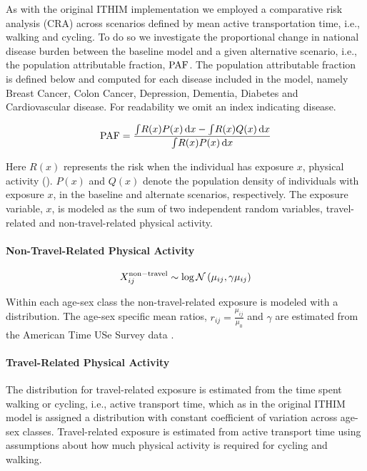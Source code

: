 As with the original ITHIM implementation we employed a comparative
risk analysis (CRA) across scenarios defined by mean active
transportation time, i.e., walking and cycling.  To do so we
investigate the proportional change in national disease burden between
the baseline model and a given alternative scenario, i.e., the
population attributable fraction, $\mathrm{PAF}$.  The population attributable
fraction is defined below and computed for each disease included in
the model, namely Breast Cancer, Colon Cancer, Depression, Dementia,
Diabetes and Cardiovascular disease.  For readability we omit an index
indicating disease.

\begin{equation}
\mathrm{PAF} = \frac{\int \! R(x)P(x) \, \mathrm{d}x  - \int \! R(x)Q(x) \,
  \mathrm{d}x}{\int \! R(x)P(x) \, \mathrm{d}x} \label{paf}
\end{equation}

Here $R(x)$ represents the risk when the individual has exposure $x$,
physical activity (\mets).  $P(x)$ and $Q(x)$ denote the population
density of individuals with exposure $x$, in the baseline and
alternate scenarios, respectively.  The exposure variable, $x$, is
modeled as the sum of two independent random variables, travel-related
and non-travel-related physical activity.

\paragraph{Non-Travel-Related Physical Activity}

\begin{equation}
X_{ij}^{\mathrm{non-travel}} \sim \log\mathcal{N}\left(\mu_{ij}, \gamma \mu_{ij}\right)
\end{equation}

Within each age-sex class the non-travel-related exposure is modeled
with a \logNormal{} distribution.  The age-sex specific mean ratios,
$r_{ij} = \frac{\mu_{ij}}{\mu_0}$ and $\gamma$ are estimated from the
American Time USe Survey data \cite{ATUS}.

\paragraph{Travel-Related Physical Activity}

The distribution for travel-related exposure is estimated from the
time spent walking or cycling, i.e., active transport time, which as
in the original ITHIM model is assigned a \logNormal{} distribution
with constant coefficient of variation across age-sex classes.
Travel-related exposure is estimated from active transport time using
assumptions about how much physical activity is required for cycling
and walking.

